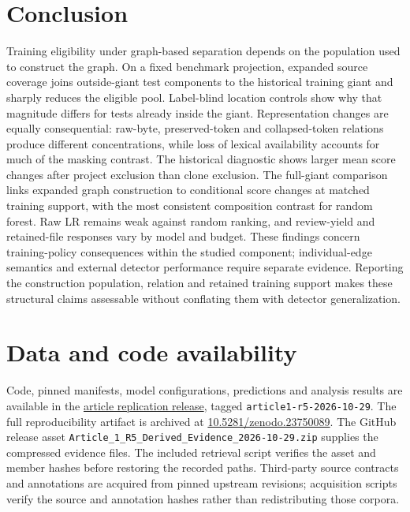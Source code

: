 \documentclass[preprint,12pt]{elsarticle}
\begin{document}
\section{Conclusion}\label{conclusion}

Training eligibility under graph-based separation depends on the population used to construct the graph. On a fixed benchmark projection, expanded source coverage joins outside-giant test components to the historical training giant and sharply reduces the eligible pool. Label-blind location controls show why that magnitude differs for tests already inside the giant. Representation changes are equally consequential: raw-byte, preserved-token and collapsed-token relations produce different concentrations, while loss of lexical availability accounts for much of the masking contrast. The historical diagnostic shows larger mean score changes after project exclusion than clone exclusion. The full-giant comparison links expanded graph construction to conditional score changes at matched training support, with the most consistent composition contrast for random forest. Raw LR remains weak against random ranking, and review-yield and retained-file responses vary by model and budget. These findings concern training-policy consequences within the studied component; individual-edge semantics and external detector performance require separate evidence. Reporting the construction population, relation and retained training support makes these structural claims assessable without conflating them with detector generalization.

\section*{Data and code availability}\label{data-and-code-availability}

Code, pinned manifests, model configurations, predictions and analysis results are available in the \href{https://github.com/KuznetsovKarazin/blockchain-detector-eval/releases/tag/article1-r5-2026-10-29}{article replication release}, tagged \texttt{article1-r5-2026-10-29}. The full reproducibility artifact is archived at \href{https://doi.org/10.5281/zenodo.23750089}{10.5281/zenodo.23750089}. The GitHub release asset \nolinkurl{Article_1_R5_Derived_Evidence_2026-10-29.zip} supplies the compressed evidence files. The included retrieval script verifies the asset and member hashes before restoring the recorded paths. Third-party source contracts and annotations are acquired from pinned upstream revisions; acquisition scripts verify the source and annotation hashes rather than redistributing those corpora.
\end{document}
